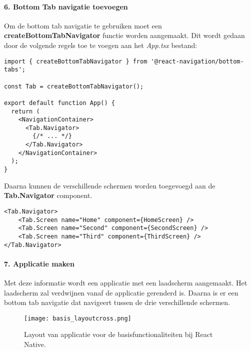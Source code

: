 \paragraph{6. Bottom Tab navigatie toevoegen}
Om de bottom tab navigatie te gebruiken moet een \textbf{createBottomTabNavigator}
functie worden aangemaakt. Dit wordt gedaan door de volgende regels toe te voegen aan het \textit{App.tsx} bestand:
\begin{verbatim}
import { createBottomTabNavigator } from '@react-navigation/bottom-tabs';

const Tab = createBottomTabNavigator();

export default function App() {
  return (
    <NavigationContainer>
      <Tab.Navigator>
        {/* ... */}
      </Tab.Navigator>
    </NavigationContainer>
  );
}
\end{verbatim}
Daarna kunnen de verschillende schermen worden toegevoegd aan de \textbf{Tab.Navigator} component.
\begin{verbatim}
<Tab.Navigator>
    <Tab.Screen name="Home" component={HomeScreen} />
    <Tab.Screen name="Second" component={SecondScreen} />
    <Tab.Screen name="Third" component={ThirdScreen} />
</Tab.Navigator>
\end{verbatim}

\paragraph{7. Applicatie maken}
Met deze informatie wordt een applicatie met een laadscherm aangemaakt.
Het laadscherm zal verdwijnen vanaf de 
applicatie gerenderd is. Daarna is er een bottom tab navigatie dat navigeert tussen 
de drie verschillende schermen. 
\begin{figure}[H]
    \centering
    \texttt{[image: basis\_layoutcross.png]}
    \caption{Layout van applicatie voor de basisfunctionaliteiten bij React Native.}
\end{figure}
